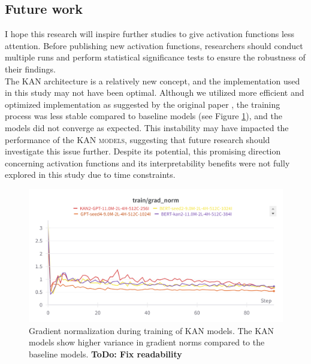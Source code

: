 \subsection{Future work}
\label{sec:future}
I hope this research will inspire further studies to give activation functions less attention. Before publishing new activation functions, researchers should conduct multiple runs and perform statistical significance tests to ensure the robustness of their findings. \\ 
The KAN architecture is a relatively new concept, and the implementation used in this study may not have been optimal. Although we utilized more efficient and optimized implementation as suggested by the original paper \cite{Liu2024}, the training process was less stable compared to baseline models (see Figure \ref{fig:grad-norm}), and the models did not converge as expected. This instability may have impacted the performance of the \textsc{KAN models}, suggesting that future research should investigate this issue further. Despite its potential, this promising direction concerning activation functions and its interpretability benefits were not fully explored in this study due to time constraints.

\begin{figure}[ht]
    \centering
    \includegraphics[width=\columnwidth]{figures/train-grad-norm.png}
    \caption{Gradient normalization during training of KAN models. The KAN models show higher variance in gradient norms compared to the baseline models. \textbf{ToDo: Fix readability}}
    \label{fig:grad-norm}
\end{figure}
